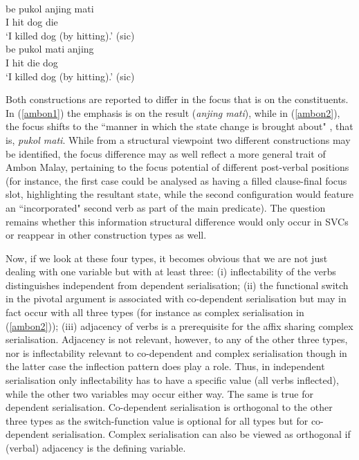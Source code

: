 \ea \label{ambon}
\\
\ea \label{ambon1}
\gll be pukol anjing mati \\
I hit dog die \\
\glft `I killed dog (by hitting).' (sic) \\ 
\ex \label{ambon2}
\gll be pukol mati anjing \\ 
I hit die dog \\
\glft `I killed dog (by hitting).' (sic) \\ 
\z
\z

Both constructions are reported to differ in the focus that is on the constituents. In (\ref{ambon1}) the emphasis is on the result (\textit{anjing mati}), while in (\ref{ambon2}), the focus shifts to the ``manner in which the state change is brought about" \citep[41]{vanstaden2008serial}, that is, \textit{pukol mati}. While from a structural viewpoint two different constructions may be identified, the focus difference may as well reflect a more general trait of Ambon Malay, pertaining to the focus potential of different post-verbal positions (for instance, the first case could be analysed as having a filled clause-final focus slot, highlighting the resultant state, while the second configuration would feature an ``incorporated" second verb as part of the main predicate). The question remains whether this information structural difference would only occur in SVCs or reappear in other construction types as well.

Now, if we look at these four types, it becomes obvious that we are not just dealing with one variable but with at least three: (i) inflectability of the verbs distinguishes independent from dependent serialisation; (ii) the functional switch in the pivotal argument is associated with co-dependent serialisation but may in fact occur with all three types (for instance as complex serialisation in (\ref{ambon2})); (iii) adjacency of verbs is a prerequisite for the affix sharing complex serialisation. Adjacency is not relevant, however, to any of the other three types, nor is inflectability relevant to co-dependent and complex serialisation though in the latter case the inflection pattern does play a role. Thus, in independent serialisation only inflectability has to have a specific value (all verbs inflected), while the other two variables may occur either way. The same is true for dependent serialisation. Co-dependent serialisation is orthogonal to the other three types as the switch-function value is optional for all types but for co-dependent serialisation. Complex serialisation can also be viewed as orthogonal if (verbal) adjacency is the defining variable. 

